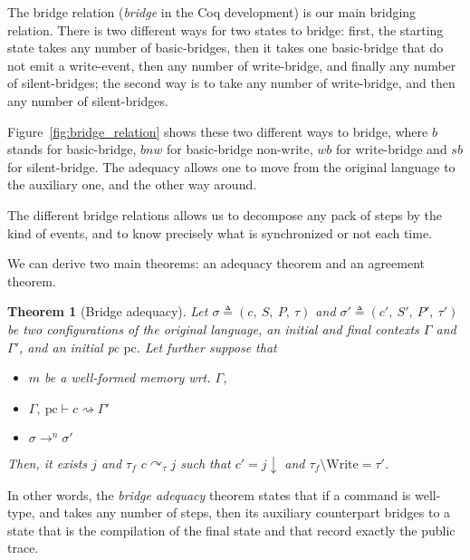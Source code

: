 \documentclass[10pt]{article}
\newcommand{\pc}{\mathrm{pc}}
\newcommand{\ctx}{\Gamma}
\newcommand{\conf}{\sigma}
\newcommand{\typing}[4]{ #1,~#2 \vdash #3 \rightsquigarrow #4}
\newcommand{\execn}[3] { #1 \rightarrow^{#2} #3 }
\newcommand{\bridge}[3] { #1 \curvearrowright_{#2} #3 }
\newcommand{\compile}[1]{ #1 \downarrow }
\newtheorem{theorem}{Theorem}
\begin{document}
The bridge relation (\emph{bridge} in the Coq development) is our main bridging relation. There is
two different ways for two states to bridge:
first, the starting state takes any number of basic-bridges, then it takes one basic-bridge that do
not emit a write-event, then any number of write-bridge, and finally any number of silent-bridges;
the second way is to take any number of write-bridge, and then any number of silent-bridges.

Figure~\ref{fig:bridge_relation} shows these two different ways to bridge, where $b$ stands for
basic-bridge, $bnw$ for basic-bridge non-write, $wb$ for write-bridge and $sb$ for silent-bridge.
The adequacy allows one to move from the original language to the auxiliary one, and the other way around.

The different bridge relations allows us to decompose any pack of steps by the kind of events, and
to know precisely what is synchronized or not each time.

We can derive two main theorems: an adequacy theorem and an agreement theorem.
\begin{theorem}[Bridge adequacy]\label{thm:adequacy}
  Let $\conf \triangleq (c,~S,~P,~\tau)$ and $\conf' \triangleq (c',~S',~P',~\tau')$ be two
  configurations of the original language, an initial and final contexts $\ctx$ and $\ctx'$, and an
  initial pc $\pc$.
  Let further suppose that

 \begin{itemize}
   \item $m$ be a well-formed memory wrt. $\ctx$,
   \item \(\typing{\ctx}{\pc}{c}{\ctx'} \)
   \item \( \execn{\conf}{n}{\conf'} \)
 \end{itemize}

  Then, it exists $j$ and $\tau_{f}$ \( \bridge{c}{\tau}{j} \) such that $c' = \compile{j}$ and $\tau_{f} \setminus \mathrm{Write} = \tau'$.
\end{theorem}

In other words, the \emph{bridge adequacy} theorem states that if a command is well-type, and takes
any number of steps, then its auxiliary counterpart bridges to a state that is the compilation of
the final state and that record exactly the public trace.
\end{document}

